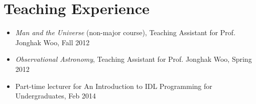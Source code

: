 \documentclass[11pt,letterpaper,roman]{moderncv}        %
\begin{document}
\section{Teaching Experience}
\begin{itemize}
\setlength\itemsep{0.0em}
\item \textit{Man and the Universe} (non-major course), Teaching
  Assistant for Prof. Jonghak Woo,  Fall 2012
\item \textit{Observational Astronomy}, Teaching Assistant for
  Prof. Jonghak Woo, Spring 2012
\item Part-time lecturer for {An Introduction to IDL Programming for Undergraduates}, Feb 2014
\end{itemize}


\end{document}
